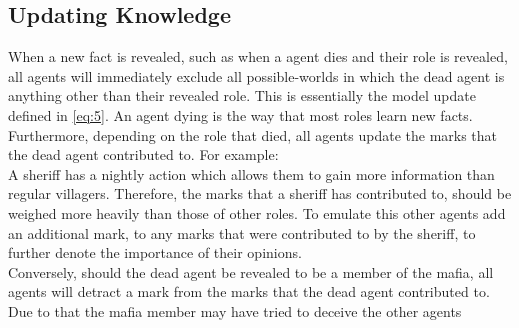 \subsection{Updating Knowledge}\label{UpdatingKnowledge}
When a new fact is revealed, such as when a agent dies and their role is
revealed, all agents will immediately exclude all possible-worlds in which the
dead agent is anything other than their revealed role. This is essentially the
model update defined in \cref{eq:5}. An agent dying is the way that most roles
learn new facts.\\ Furthermore, depending on the role that died, all agents
update the marks that the dead agent contributed to. For example:\\ A sheriff
has a nightly action which allows them to gain more information than regular
villagers. Therefore, the marks that a sheriff has contributed to, should be
weighed more heavily than those of other roles. To emulate this other agents
add an additional mark, to any marks that were contributed to by the sheriff,
to further denote the importance of their opinions. \\ Conversely, should the
dead agent be revealed to be a member of the mafia, all agents will detract a
mark from the marks that the dead agent contributed to. Due to that the mafia
member may have tried to deceive the other agents
